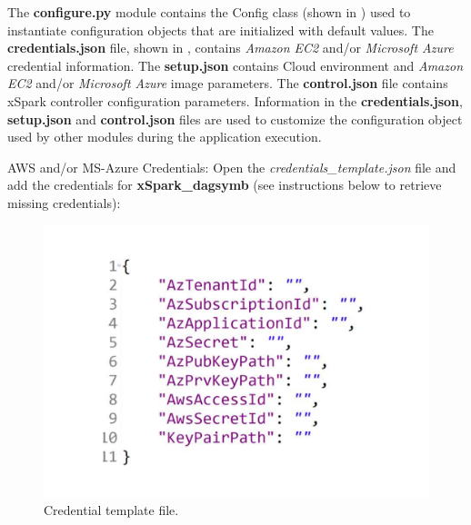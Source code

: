 The \textbf{configure.py} module contains the Config class (shown in ) used to instantiate configuration objects that are initialized with default values. The \textbf{credentials.json} file, shown in , contains \emph{Amazon EC2}
and/or \emph{Microsoft Azure} credential information. The
\textbf{setup.json} contains Cloud environment and \emph{Amazon EC2}
and/or \emph{Microsoft Azure} image parameters. The
\textbf{control.json} file contains xSpark controller configuration
parameters. Information in the \textbf{credentials.json},
\textbf{setup.json} and \textbf{control.json} files are used to
customize the configuration object used by other modules during the
application execution.

AWS and/or MS-Azure Credentials: Open the
\emph{credentials\_template.json} file and add the credentials for \textbf{xSpark\_dagsymb} (see instructions below to retrieve missing
credentials):
\begin{figure}[thbp]
	\centering
	\includegraphics[width=\columnwidth]{images/xspark_dagsymb_credentials_template.pdf}
	\caption{Credential template file.}
	\label{fig:xspark_dagsymb_credentials_template}
\end{figure}

